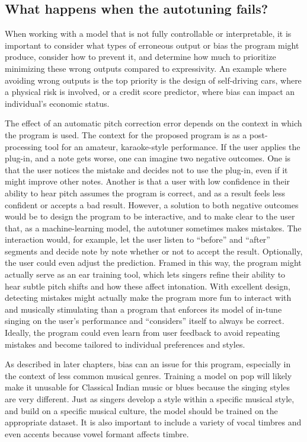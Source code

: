 \subsection{What happens when the autotuning fails?}
When working with a model that is not fully controllable or interpretable, it is important to consider what types of erroneous output or bias the program might produce, consider how to prevent it, and determine how much to prioritize minimizing these wrong outputs compared to expressivity. An example where avoiding wrong outputs is the top priority is the design of self-driving cars, where a physical risk is involved, or a credit score predictor, where bias can impact an individual's economic status. 

The effect of an automatic pitch correction error depends on the context in which the program is used. The context for the proposed program is as a post-processing tool for an amateur, karaoke-style performance. If the user applies the plug-in, and a note gets worse, one can imagine two negative outcomes. One is that the user notices the mistake and decides not to use the plug-in, even if it might improve other notes. Another is that a user with low confidence in their ability to hear pitch assumes the program is correct, and as a result feels less confident or accepts a bad result. However, a solution to both negative outcomes would be to design the program to be interactive, and to make clear to the user that, as a machine-learning model, the autotuner sometimes makes mistakes. The interaction would, for example, let the user listen to ``before'' and ``after'' segments and decide note by note whether or not to accept the result. Optionally, the user could even adjust the prediction. Framed in this way, the program might actually serve as an ear training tool, which lets singers refine their ability to hear subtle pitch shifts and how these affect intonation. With excellent design, detecting mistakes might actually make the program more fun to interact with and musically stimulating than a program that enforces its model of in-tune singing on the user's performance and ``considers'' itself to always be correct. Ideally, the program could even learn from user feedback to avoid repeating mistakes and become tailored to individual preferences and styles.

As described in later chapters, bias can an issue for this program, especially in the context of less common musical genres. Training a model on pop will likely make it unusable for Classical Indian music or blues because the singing styles are very different. Just as singers develop a style within a specific musical style, and build on a specific musical culture, the model should be trained on the appropriate dataset. It is also important to include a variety of vocal timbres and even accents because vowel formant affects timbre. 

